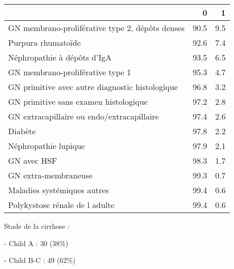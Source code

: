 \documentclass[11pt,a4paper]{article}\usepackage[]{graphicx}\usepackage[]{color}
\begin{document}
\begin{table}[H]
\centering
\begin{tabular}{lrr}
  \hline
 & 0 & 1 \\ 
  \hline
GN membrano-proliférative type 2, dépôts denses & 90.5 & 9.5 \\ 
  Purpura rhumatoïde & 92.6 & 7.4 \\ 
  Néphropathie à dépôts d'IgA & 93.5 & 6.5 \\ 
  GN membrano-proliférative type 1 & 95.3 & 4.7 \\ 
  GN primitive avec autre diagnostic histologique & 96.8 & 3.2 \\ 
  GN primitive sans examen histologique & 97.2 & 2.8 \\ 
  GN extracapillaire ou endo/extracapillaire & 97.4 & 2.6 \\ 
  Diabète & 97.8 & 2.2 \\ 
  Néphropathie lupique & 97.9 & 2.1 \\ 
  GN avec HSF & 98.3 & 1.7 \\ 
  GN extra-membraneuse & 99.3 & 0.7 \\ 
  Maladies systémiques autres & 99.4 & 0.6 \\ 
  Polykystose rénale de l adulte & 99.4 & 0.6 \\ 
   \hline
\end{tabular}
\end{table}


Stade de la cirrhose :

- Child A : 30 (38\%)

- Child B-C : 49 (62\%)
\end{document}

